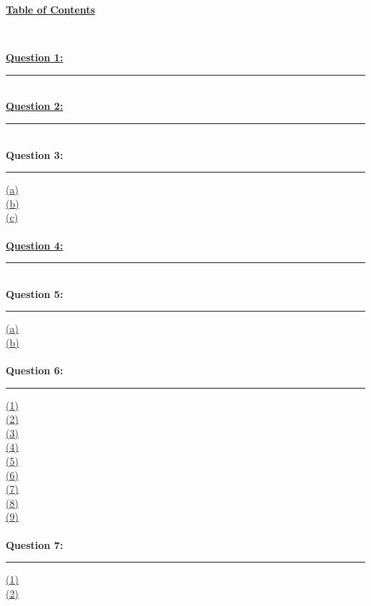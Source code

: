 \documentclass[12pt]{article}
\begin{document}
\begin{center}
	\hypertarget{toc}{\LARGE \underline{\textbf{Table of Contents}}}\\
\end{center}

\hyperlink{1}{\textbf{Question 1:}}
\vspace{1mm}
\hrule
~\\

\hyperlink{2}{\textbf{Question 2:}}
\vspace{1mm}
\hrule
~\\

{\textbf{Question 3:}}
\vspace{1mm}
\hrule
\vspace{1mm}
\hyperlink{3.1}{(a)}\\
\hyperlink{3.2}{(b)}\\
\hyperlink{3.3}{(c)}\\
\\

\hyperlink{4}{\textbf{Question 4:}}
\vspace{1mm}
\hrule
~\\

{\textbf{Question 5:}}
\vspace{1mm}
\hrule
\vspace{1mm}
\hyperlink{5.1}{(a)}\\
\hyperlink{5.2}{(b)}\\
~\\

{\textbf{Question 6:}}
\vspace{1mm}
\hrule
\vspace{1mm}
\hyperlink{6.1}{(1)}\\
\hyperlink{6.2}{(2)}\\
\hyperlink{6.3}{(3)}\\
\hyperlink{6.4}{(4)}\\
\hyperlink{6.5}{(5)}\\
\hyperlink{6.6}{(6)}\\
\hyperlink{6.7}{(7)}\\
\hyperlink{6.8}{(8)}\\
\hyperlink{6.9}{(9)}\\
~\\

{\textbf{Question 7:}}
\vspace{1mm}
\hrule
\vspace{1mm}
\hyperlink{7.1}{(1)}\\
\hyperlink{7.2}{(2)}\\
\\
\end{document}
